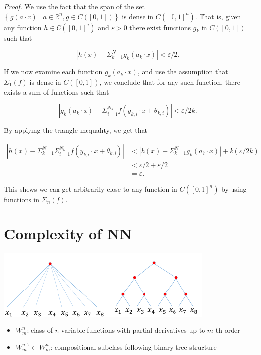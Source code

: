 \textit{Proof.} We use the fact that the span of the set $\left\{g(a \cdot x) \mid a \in \mathbb{R}^n, g \in C([0,1])\right\}$ is dense in $C\left([0,1]^n\right)$. That is, given any function $h \in C\left([0,1]^n\right)$ and $\varepsilon>0$ there exist functions $g_k$ in $C([0,1])$ such that

$$
\left|h(x)-\Sigma_{k=1}^N g_k\left(a_k \cdot x\right)\right|<\varepsilon / 2 .
$$

If we now examine each function $g_k\left(a_k \cdot x\right)$, and use the assumption that $\Sigma_1(f)$ is dense in $C([0,1])$, we conclude that for any such function, there exists a sum of functions such that

$$
\left|g_k\left(a_k \cdot x\right)-\Sigma_{i=1}^{N_k} f\left(y_{k, i} \cdot x+\theta_{k, i}\right)\right|<\varepsilon / 2 k .
$$

By applying the triangle inequality, we get that

$$
\begin{aligned}
\left|h(x)-\Sigma_{k=1}^N \Sigma_{i=1}^{N_k} f\left(y_{k, i} \cdot x+\theta_{k, i}\right)\right| & <\left|h(x)-\Sigma_{k=1}^N g_k\left(a_k \cdot x\right)\right|+k(\varepsilon / 2 k) \\
& <\varepsilon / 2+\varepsilon / 2 \\
& =\varepsilon .
\end{aligned}
$$

This shows we can get arbitrarily close to any function in $C\left([0,1]^n\right)$ by using functions in $\Sigma_n(f)$.



\section{Complexity of NN}
\begin{center}
    \includegraphics[scale=2.5]{../images/ComplexityNN.png}
\end{center}

\begin{itemize}
  \item $W_m^n$: class of $n$-variable functions with partial derivatives up to $m$-th order

  \item $W_m^{n,2}\subset W_m^n$: compositional subclass following binary tree structure

\end{itemize}

